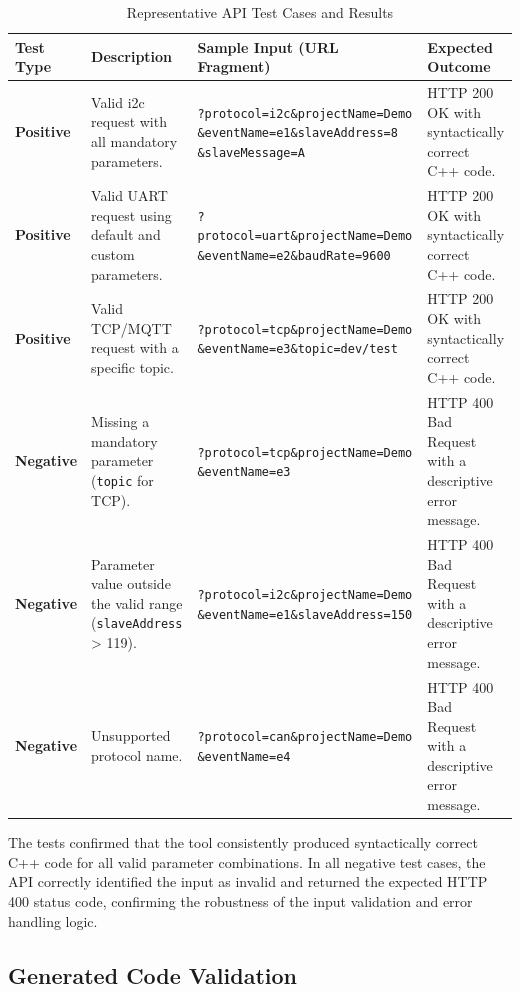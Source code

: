 \begin{table}[h!]
\centering
\caption{Representative API Test Cases and Results}
\label{tab:api_test_cases}
\begin{tabular}{|l|p{2.5cm}|p{6cm}|p{3.5cm}|}
\hline
\textbf{Test Type} & \textbf{Description} & \textbf{Sample Input (URL Fragment)} & \textbf{Expected Outcome} \\ \hline
\textbf{Positive} & Valid \gls{i2c} request with all mandatory parameters. & \texttt{?protocol=\gls{i2c}\&projectName=Demo \&eventName=e1\&slaveAddress=8 \&slaveMessage=A} & HTTP 200 OK with syntactically correct C++ code. \\ \hline
\textbf{Positive} & Valid UART request using default and custom parameters. & \texttt{?protocol=uart\&projectName=Demo \&eventName=e2\&baudRate=9600} & HTTP 200 OK with syntactically correct C++ code. \\ \hline
\textbf{Positive} & Valid TCP/MQTT request with a specific topic. & \texttt{?protocol=tcp\&projectName=Demo \&eventName=e3\&topic=dev/test} & HTTP 200 OK with syntactically correct C++ code. \\ \hline
\textbf{Negative} & Missing a mandatory parameter (\texttt{topic} for TCP). & \texttt{?protocol=tcp\&projectName=Demo \&eventName=e3} & HTTP 400 Bad Request with a descriptive error message. \\ \hline
\textbf{Negative} & Parameter value outside the valid range (\texttt{slaveAddress} > 119). & \texttt{?protocol=\gls{i2c}\&projectName=Demo \&eventName=e1\&slaveAddress=150} & HTTP 400 Bad Request with a descriptive error message. \\ \hline
\textbf{Negative} & Unsupported protocol name. & \texttt{?protocol=can\&projectName=Demo \&eventName=e4} & HTTP 400 Bad Request with a descriptive error message. \\ \hline
\end{tabular}
\end{table}

  The tests confirmed that the tool consistently produced syntactically correct C++ code for all valid parameter combinations.   In all negative test cases, the API correctly identified the input as invalid and returned the expected HTTP 400 status code, confirming the robustness of the input validation and error handling logic.

\subsection{Generated Code Validation}
\label{subsec:code_validation}

